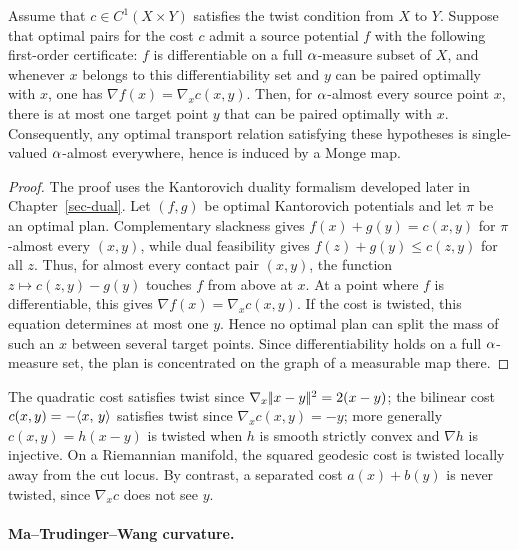 \begin{prop}\label{prop-twist-prevents-splitting}
	Assume that $c\in C^1(X\times Y)$ satisfies the twist condition from $X$ to $Y$. Suppose that optimal pairs for the cost $c$ admit a source potential $f$ with the following first-order certificate: $f$ is differentiable on a full $\alpha$-measure subset of $X$, and whenever $x$ belongs to this differentiability set and $y$ can be paired optimally with $x$, one has $\nabla f(x)=\nabla_x c(x,y)$. Then, for $\alpha$-almost every source point $x$, there is at most one target point $y$ that can be paired optimally with $x$. Consequently, any optimal transport relation satisfying these hypotheses is single-valued $\alpha$-almost everywhere, hence is induced by a Monge map.
\end{prop}
\begin{proof}
	The proof uses the Kantorovich duality formalism developed later in Chapter~\ref{sec-dual}. Let $(f,g)$ be optimal Kantorovich potentials and let $\pi$ be an optimal plan. Complementary slackness gives $f(x)+g(y)=c(x,y)$ for $\pi$-almost every $(x,y)$, while dual feasibility gives $f(z)+g(y)\leq c(z,y)$ for all $z$. Thus, for almost every contact pair $(x,y)$, the function $z\mapsto c(z,y)-g(y)$ touches $f$ from above at $x$. At a point where $f$ is differentiable, this gives
	\(\nabla f(x)=\nabla_x c(x,y)\).
	If the cost is twisted, this equation determines at most one $y$. Hence no optimal plan can split the mass of such an $x$ between several target points. Since differentiability holds on a full $\alpha$-measure set, the plan is concentrated on the graph of a measurable map there.
\end{proof}

The quadratic cost satisfies twist since $\nabla_x|\!| x-y |\!|^2=2(x-y)$; the bilinear cost $c(x,y)=-\langle x,\,y\rangle$ satisfies twist since $\nabla_x c(x,y)=-y$; more generally $c(x,y)=h(x-y)$ is twisted when $h$ is smooth strictly convex and $\nabla h$ is injective. On a Riemannian manifold, the squared geodesic cost is twisted locally away from the cut locus. By contrast, a separated cost $a(x)+b(y)$ is never twisted, since $\nabla_x c$ does not see $y$.

\paragraph{Ma--Trudinger--Wang curvature.}

